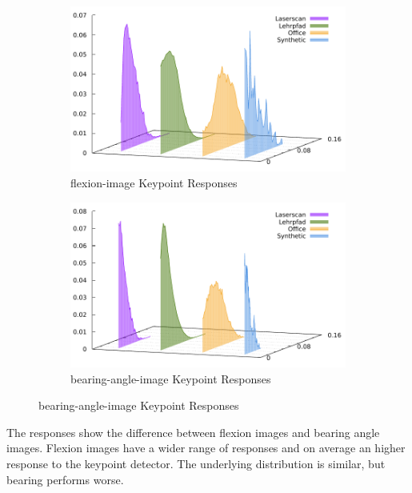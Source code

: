 \begin{figure}[H]
\begin{subfigure}[t]{0.45\linewidth}
    \includegraphics[width=\linewidth]{chapter06/results/SIFT/flexion/response.pdf}%
    \caption{\gls{flexion-image} Keypoint Responses}
\end{subfigure}\quad
\begin{subfigure}[t]{0.45\linewidth}
    \includegraphics[width=\linewidth]{chapter06/results/SIFT/bearing/response.pdf}%
    \caption{\gls{bearing-angle-image} Keypoint Responses}
\end{subfigure}
\end{figure}
The responses show the difference between flexion images and bearing angle images.
Flexion images have a wider range of responses and on average an higher response to the keypoint detector.
The underlying distribution is similar, but bearing performs worse.
